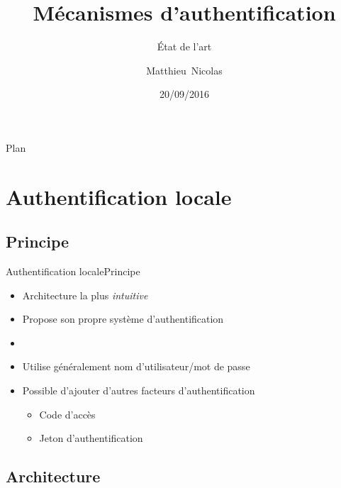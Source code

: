\documentclass{beamer}
\title{Mécanismes d'authentification}
\subtitle{État de l'art}
\author{Matthieu~Nicolas}
\date{20/09/2016}
\begin{document}
\begin{frame}
  \titlepage
\end{frame}

\begin{frame}{Plan}
  \tableofcontents
\end{frame}

\section{Authentification locale}

\subsection{Principe}

\begin{frame}{Authentification locale}{Principe}
  \begin{center}
    \begin{itemize}
      \item Architecture la plus \emph{intuitive}
      \item Propose son propre système d'authentification
      \item[~]
      \item Utilise généralement nom d'utilisateur/mot de passe
      \item Possible d'ajouter d'autres facteurs d'authentification
      \begin{itemize}
        \item Code d'accès
        \item Jeton d'authentification
      \end{itemize}
    \end{itemize}
  \end{center}
\end{frame}

\subsection{Architecture}
\end{document}
